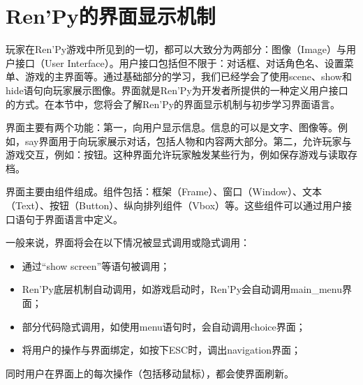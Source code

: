 \section{Ren'Py的界面显示机制}
玩家在Ren'Py游戏中所见到的一切，都可以大致分为两部分：图像（Image）与用户接口（User Interface）。用户接口包括但不限于：对话框、对话角色名、设置菜单、游戏的主界面等。通过基础部分的学习，我们已经学会了使用scene、show和hide语句向玩家展示图像。界面就是Ren'Py为开发者所提供的一种定义用户接口的方式。在本节中，您将会了解Ren'Py的界面显示机制与初步学习界面语言。

界面主要有两个功能：第一，向用户显示信息。信息的可以是文字、图像等。例如，say界面用于向玩家展示对话，包括人物和内容两大部分。第二，允许玩家与游戏交互，例如：按钮。这种界面允许玩家触发某些行为，例如保存游戏与读取存档。

界面主要由组件组成。组件包括：框架（Frame）、窗口（Window）、文本（Text）、按钮（Button）、纵向排列组件（Vbox）等。这些组件可以通过用户接口语句于界面语言中定义。

一般来说，界面将会在以下情况被显式调用或隐式调用：

\begin{itemize}
    \item 通过“show screen”等语句被调用；
    \item Ren'Py底层机制自动调用，如游戏启动时，Ren'Py会自动调用main\_menu界面；
    \item 部分代码隐式调用，如使用menu语句时，会自动调用choice界面；
    \item 将用户的操作与界面绑定，如按下ESC时，调出navigation界面；
\end{itemize}

同时用户在界面上的每次操作（包括移动鼠标），都会使界面刷新。

